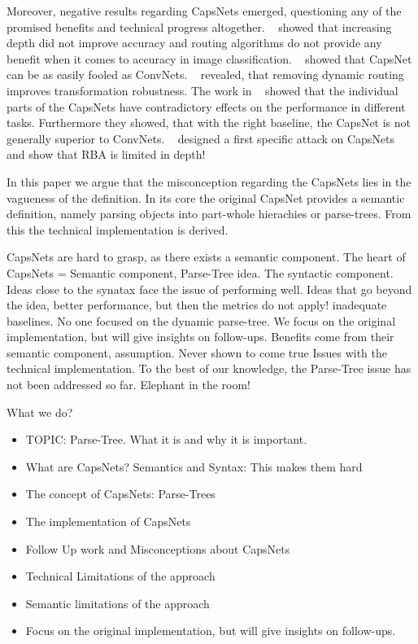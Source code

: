 \documentclass{article}
\begin{document}
Moreover, negative results regarding CapsNets emerged, questioning any of the promised benefits and technical progress altogether.
~\cite{acml/PaikKK19} showed that increasing depth did not improve accuracy and routing algorithms do not provide any benefit when it comes to accuracy in image classification.
~\cite{corr/michels2019} showed that CapsNet can be as easily fooled as ConvNets.
~\cite{ieee/Gu2020} revealed, that removing dynamic routing improves transformation robustness.
The work in ~\cite{cvpr/GuT021} showed that the individual parts of the CapsNets have contradictory effects on the performance in different tasks. Furthermore they showed, that with the right baseline, the CapsNet is not generally superior to ConvNets.
~\cite{iclr/Gu2021} designed a first specific attack on CapsNets and
\cite{prl/PeerSR21} show that RBA is limited in depth!

In this paper we argue that the misconception regarding the CapsNets lies in the vagueness of the definition.
In its core the original CapsNet provides a semantic definition, namely parsing objects into part-whole hierachies or parse-trees.
From this the technical implementation is derived.


CapsNets are hard to grasp, as there exists a semantic component.
The heart of CapsNets = Semantic component, Parse-Tree idea.
The syntactic component.
Ideas close to the synatax face the issue of performing well.
Ideas that go beyond the idea, better performance, but then the metrics do not apply! inadequate baselines.
No one focused on the dynamic parse-tree.
We focus on the original implementation, but will give insights on follow-ups.
Benefits come from their semantic component, assumption. Never shown to come true
Issues with the technical implementation.
To the best of our knowledge, the Parse-Tree issue has not been addressed so far. Elephant in the room!

What we do?
\begin{itemize}
	\item TOPIC: Parse-Tree. What it is and why it is important.
	\item What are CapsNets? Semantics and Syntax: This makes them hard
	\item The concept of CapsNets: Parse-Trees
	\item The implementation of CapsNets
	\item Follow Up work and Misconceptions about CapsNets
	\item Technical Limitations of the approach
	\item Semantic limitations of the approach
	\item Focus on the original implementation, but will give insights on follow-ups.
\end{itemize}
\end{document}
